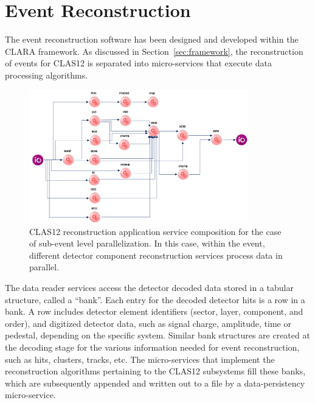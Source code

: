 \section{Event Reconstruction}
\label{sec:recon}

The event reconstruction software has been designed and developed within the CLARA framework. As discussed
in Section~\ref{sec:framework}, the reconstruction of events for CLAS12 is separated into micro-services that
execute data processing algorithms.

\begin{figure}
\centering
\includegraphics[width=0.85\textwidth]{pics/ServiceComposition.png}
\caption{CLAS12 reconstruction application service composition for the case of sub-event level parallelization.
In this case, within the event, different detector component reconstruction services process data in parallel.}
\label{fig:services}
\end{figure}

The data reader services access the detector decoded data stored in a tabular structure, called a ``bank''.
Each entry for the decoded detector hits is a row in a bank. A row includes detector element identifiers (sector,
layer, component, and order), and digitized detector data, such as signal charge, amplitude, time or pedestal,
depending on the specific system. Similar bank structures are created at the decoding stage for the various
information needed for event reconstruction, such as hits, clusters, tracks, etc. The micro-services that
implement the reconstruction algorithms pertaining to the CLAS12 subsystems fill these banks, which are
subsequently appended and written out to a file by a data-persistency micro-service.

